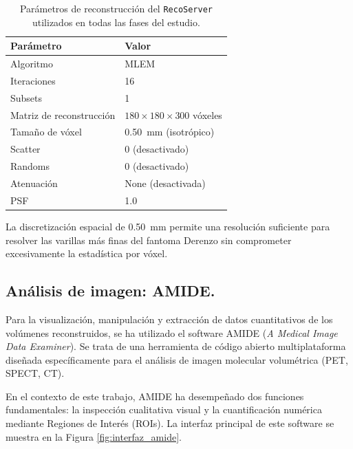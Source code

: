\begin{table}[h]
  \centering
  \renewcommand{\arraystretch}{1.3}
  \begin{tabular}{l l}
    \hline
    \textbf{Parámetro}       & \textbf{Valor}                       \\
    \hline
    Algoritmo                & MLEM                                 \\
    Iteraciones              & 16                                   \\
    Subsets                  & 1                                    \\
    Matriz de reconstrucción & $180 \times 180 \times 300$ vóxeles  \\
    Tamaño de vóxel          & \SI{0.50}{\milli\meter} (isotrópico) \\
    \hline
    Scatter                  & 0 (desactivado)                      \\
    Randoms                  & 0 (desactivado)                      \\
    Atenuación               & None (desactivada)                   \\
    PSF                      & 1.0                                  \\
    \hline
  \end{tabular}
  \caption{Parámetros de reconstrucción del \texttt{RecoServer} utilizados en todas las fases del estudio.}
  \label{tab:reco_params}
\end{table}

La discretización espacial de \SI{0.50}{\milli\meter} permite una resolución suficiente para resolver las varillas más finas del fantoma Derenzo sin comprometer excesivamente la estadística por vóxel.

\subsection{Análisis de imagen: AMIDE.}
Para la visualización, manipulación y extracción de datos cuantitativos de los volúmenes reconstruidos, se ha utilizado el software AMIDE (\textit{A Medical Image Data Examiner}). Se trata de una herramienta de código abierto multiplataforma diseñada específicamente para el análisis de imagen molecular volumétrica (PET, SPECT, CT).

En el contexto de este trabajo, AMIDE ha desempeñado dos funciones fundamentales: la inspección cualitativa visual y la cuantificación numérica mediante Regiones de Interés (ROIs). La interfaz principal de este software se muestra en la Figura \ref{fig:interfaz_amide}.

